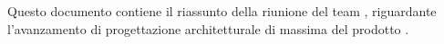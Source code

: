 Questo documento contiene il riassunto della riunione del team \gruppo, riguardante l'avanzamento di progettazione architetturale di massima del prodotto \progetto.

